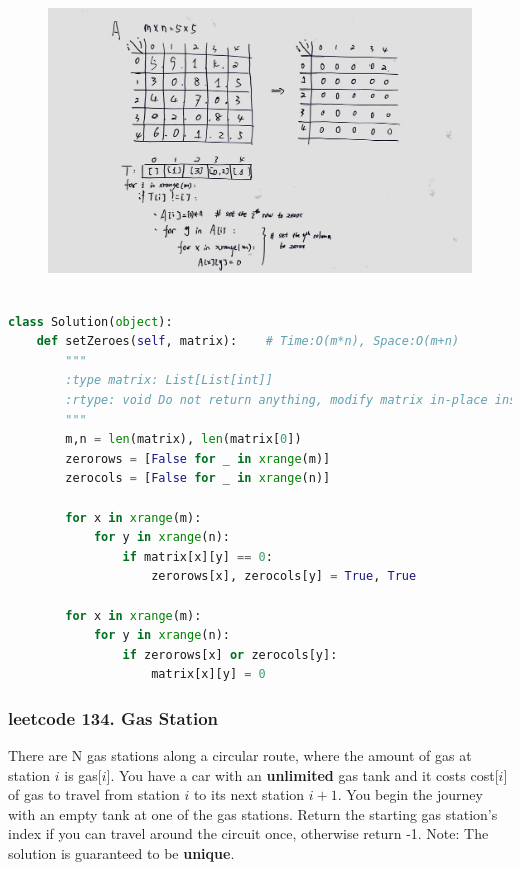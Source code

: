 \documentclass[a4paper,10pt]{article}
\begin{document}
\begin{figure}[h]
    \includegraphics[width=\textwidth]{leetcode73.jpg}
    \centering \\
\end{figure}

\begin{lstlisting}[language=Python, caption=Problem73. Set Matrix Zeroes]

class Solution(object):
    def setZeroes(self, matrix):    # Time:O(m*n), Space:O(m+n)
        """
        :type matrix: List[List[int]]
        :rtype: void Do not return anything, modify matrix in-place instead.
        """
        m,n = len(matrix), len(matrix[0])
        zerorows = [False for _ in xrange(m)]
        zerocols = [False for _ in xrange(n)]

        for x in xrange(m):
            for y in xrange(n):
                if matrix[x][y] == 0:
                    zerorows[x], zerocols[y] = True, True

        for x in xrange(m):
            for y in xrange(n):
                if zerorows[x] or zerocols[y]:
                    matrix[x][y] = 0
\end{lstlisting}


\subsubsection{leetcode 134. Gas Station}
There are N gas stations along a circular route, where the amount of gas at station $i$ is gas[$i$]. You have a car with an \textbf{unlimited} gas tank and it costs cost[$i$] of gas to travel from station $i$ to its next station $i+1$. You begin the journey with an empty tank at one of the gas stations. Return the starting gas station's index if you can travel around the circuit once, otherwise return -1. Note: The solution is guaranteed to be \textbf{unique}.\\
\end{document}
